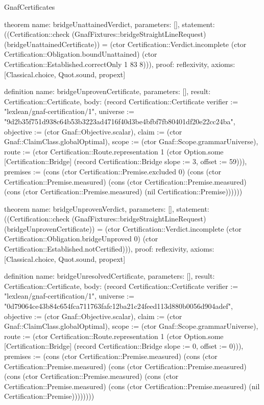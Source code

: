 \begin{lexlean}{GnafCertificates}
\begin{semanticmodule}
theorem{
  name: bridgeUnattainedVerdict,
  parameters: [],
  statement: ((Certification::check (GnafFixtures::bridgeStraightLineRequest) (bridgeUnattainedCertificate)) = (ctor Certification::Verdict.incomplete (ctor Certification::Obligation.boundUnattained) (ctor Certification::Established.correctOnly 1 83 8))),
  proof: reflexivity{},
  axioms: [Classical.choice, Quot.sound, propext]
}

definition{
  name: bridgeUnprovenCertificate,
  parameters: [],
  result: Certification::Certificate,
  body: (record Certification::Certificate {verifier := "lexlean/gnaf-certification/1", universe := "9d2b35f751d938c64b53b3223ad4716f40d3be4bfbf7fb80401df20e22cc24ba", objective := (ctor Gnaf::Objective.scalar), claim := (ctor Gnaf::ClaimClass.globalOptimal), scope := (ctor Gnaf::Scope.grammarUniverse), route := (ctor Certification::Route.representation 1 (ctor Option.some [Certification::Bridge] (record Certification::Bridge {slope := 3, offset := 59}))), premises := (cons (ctor Certification::Premise.excluded 0) (cons (ctor Certification::Premise.measured) (cons (ctor Certification::Premise.measured) (cons (ctor Certification::Premise.measured) (nil Certification::Premise)))))})
}

theorem{
  name: bridgeUnprovenVerdict,
  parameters: [],
  statement: ((Certification::check (GnafFixtures::bridgeStraightLineRequest) (bridgeUnprovenCertificate)) = (ctor Certification::Verdict.incomplete (ctor Certification::Obligation.bridgeUnproved 0) (ctor Certification::Established.notCertified))),
  proof: reflexivity{},
  axioms: [Classical.choice, Quot.sound, propext]
}

definition{
  name: bridgeUnresolvedCertificate,
  parameters: [],
  result: Certification::Certificate,
  body: (record Certification::Certificate {verifier := "lexlean/gnaf-certification/1", universe := "0d79064ce43b84c654fca711763fafc12ba21c24feed113d880b0056d904adef", objective := (ctor Gnaf::Objective.scalar), claim := (ctor Gnaf::ClaimClass.globalOptimal), scope := (ctor Gnaf::Scope.grammarUniverse), route := (ctor Certification::Route.representation 1 (ctor Option.some [Certification::Bridge] (record Certification::Bridge {slope := 0, offset := 0}))), premises := (cons (ctor Certification::Premise.measured) (cons (ctor Certification::Premise.measured) (cons (ctor Certification::Premise.measured) (cons (ctor Certification::Premise.measured) (cons (ctor Certification::Premise.measured) (cons (ctor Certification::Premise.measured) (nil Certification::Premise)))))))})
}


\end{semanticmodule}
\end{lexlean}

